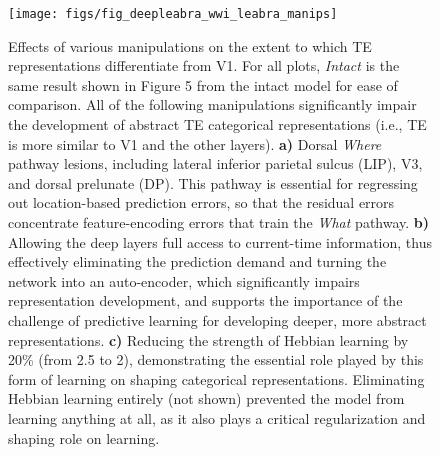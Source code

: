 \documentclass[11pt,twoside]{article}
\newif\myifpdf
\begin{document}
\begin{figure}
  \centering\texttt{[image: figs/fig\_deepleabra\_wwi\_leabra\_manips]}
  \caption{Effects of various manipulations on the extent to which TE representations differentiate from V1.  For all plots, \emph{Intact} is the same result shown in Figure 5 from the intact model for ease of comparison.  All of the following  manipulations significantly impair the development of abstract TE categorical representations (i.e., TE is more similar to V1 and the other layers).  {\bf a)} Dorsal \emph{Where} pathway lesions, including lateral inferior parietal sulcus (LIP), V3, and dorsal prelunate (DP).  This pathway is essential for regressing out location-based prediction errors, so that the residual errors concentrate feature-encoding errors that train the \emph{What} pathway.  {\bf b)} Allowing the deep layers full access to current-time information, thus effectively eliminating the prediction demand and turning the network into an auto-encoder, which significantly impairs representation development, and supports the importance of the challenge of predictive learning for developing deeper, more abstract representations.  {\bf c)} Reducing the strength of Hebbian learning by 20\% (from 2.5 to 2), demonstrating the essential role played by this form of learning on shaping categorical representations.  Eliminating Hebbian learning entirely (not shown) prevented the model from learning anything at all, as it also plays a critical regularization and shaping role on learning.}
  \label{fig.manips}
\end{figure}
\end{document}
